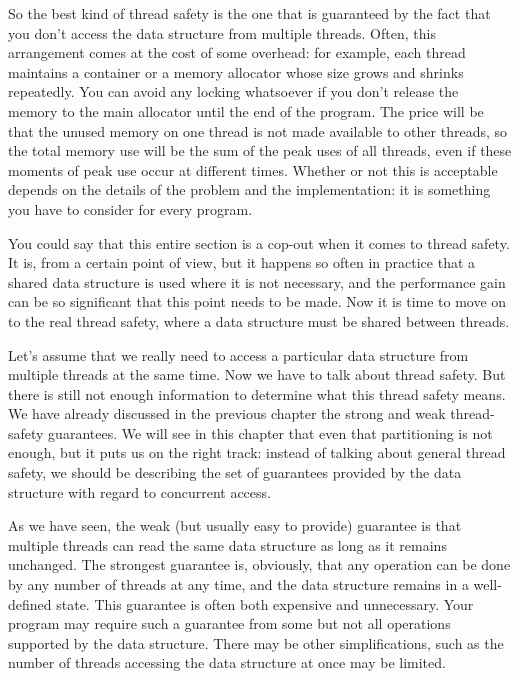 So the best kind of thread safety is the one that is guaranteed by the fact that you don't access the data structure from multiple threads. Often, this arrangement comes at the cost of some overhead: for example, each thread maintains a container or a memory allocator whose size grows and shrinks repeatedly. You can avoid any locking whatsoever if you don't release the memory to the main allocator until the end of the program. The price will be that the unused memory on one thread is not made available to other threads, so the total memory use will be the sum of the peak uses of all threads, even if these moments of peak use occur at different times. Whether or not this is acceptable depends on the details of the problem and the implementation: it is something you have to consider for every program.

You could say that this entire section is a cop-out when it comes to thread safety. It is, from a certain point of view, but it happens so often in practice that a shared data structure is used where it is not necessary, and the performance gain can be so significant that this point needs to be made. Now it is time to move on to the real thread safety, where a data structure must be shared between threads.


Let's assume that we really need to access a particular data structure from multiple threads at the same time. Now we have to talk about thread safety. But there is still not enough information to determine what this thread safety means. We have already discussed in the previous chapter the strong and weak thread-safety guarantees. We will see in this chapter that even that partitioning is not enough, but it puts us on the right track: instead of talking about general thread safety, we should be describing the set of guarantees provided by the data structure with regard to concurrent access.

As we have seen, the weak (but usually easy to provide) guarantee is that multiple threads can read the same data structure as long as it remains unchanged. The strongest guarantee is, obviously, that any operation can be done by any number of threads at any time, and the data structure remains in a well-defined state. This guarantee is often both expensive and unnecessary. Your program may require such a guarantee from some but not all operations supported by the data structure. There may be other simplifications, such as the number of threads accessing the data structure at once may be limited.

